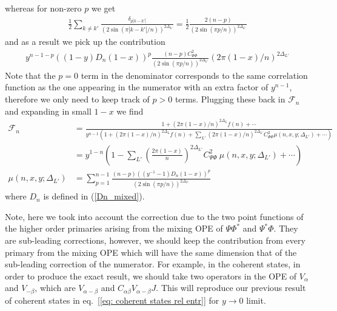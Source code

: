 \documentclass[11pt]{article}
\newcommand{\nn}{\nonumber}
\newcommand{\lb}{\left(}
\newcommand{\rb}{\right)}
\newcommand{\JM}[1]{\textcolor{orange}{#1}}
\begin{document}
whereas for non-zero $p$ we get
\begin{align}
  \frac{1}{2}\sum_{k\neq k'}\frac{\delta_{p|k-k'|}}{(2\sin(\pi|k-k'|/n))^{2\Delta_{L'}}}=\frac{1}{2}\frac{2(n-p)}{(2\sin(\pi p/n))^{2\Delta_{L'}}}
\end{align}
and as a result we pick up the contribution
\begin{align}
  y^{n-1-p}((1-y) D_n(1-x))^p \frac{(n-p) C_{\Psi\Phi}^2}{(2\sin(\pi p/n))^{2\Delta_{L'}}}(2\pi (1-x)/n)^{2\Delta_{L'}}
\end{align}
Note that the $p=0$ term in the denominator corresponds to the same correlation function as the one appearing in the numerator with an extra factor of $y^{n-1}$, therefore we only need to keep track of $p>0$ terms. Plugging these back in $\mathcal{F}_n$ and expanding in small $1-x$ we find
\begin{align}
\mathcal{F}_n
    &=\frac{\,1+(2\pi (1-x)/n)^{2\Delta_L}f(n)+\cdots\,}{\displaystyle y^{n-1}\lb 1+(2\pi (1-x)/n)^{2\Delta_L} f(n)+\sum_{L'}\lb 2\pi (1-x)/n\rb ^{2\Delta_{L'}} C_{\Psi\Phi}^2\mu(n,x,y;\Delta_{L'})+\cdots\rb}\nn\\
&=y^{1-n}\lb 1-\sum_{L'}\lb\frac{2\pi (1-x)}{n}\rb^{2\Delta_{L'}}  C_{\Psi\Phi}^2 \:\mu(n,x,y;\Delta_{L'})+\cdots \rb\nn\\
\mu(n,x,y;\Delta_{L'})&=\sum_{p=1}^{n-1}\frac{(n-p)((y^{-1}-1)D_n(1-x))^p}{(2\sin(\pi p/n))^{2\Delta_{L'}}} \label{eq: mu (n,x,DeltaL')}
\end{align}
where $D_n$ is defined in (\ref{Dn_mixed}). 


Note, here we took into account the correction due to the two point functions of the higher order primaries arising from the mixing OPE of $\Psi \Phi^*$ and $\Psi^* \Phi$. They are sub-leading corrections, however, we should keep the contribution from every primary from the mixing OPE which will have the same dimension that of the sub-leading correction of the numerator. For example, in the coherent states, in order to produce the exact result, we should take two operators in the OPE of $V_\alpha$ and $V_{-\beta}$, which are $V_{\alpha - \beta}$ and $C_{\alpha\beta} V_{\alpha-\beta}J$. This will reproduce our previous result of coherent states in eq.~[\ref{eq: coherent states rel entr}] for $y\to 0$ limit. 
\end{document}
